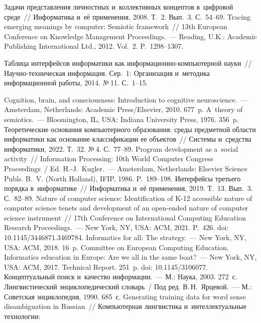 {\begin{multicols}{2}
{{\begin{thebibliography}{99}
 Задачи пред\-став\-ле\-ния 
личностных и~коллективных кон\-цеп\-тов в~циф\-ро\-вой среде~// Информатика 
и~её применения, 2008. Т.~2. Вып.~3. С.~54--69.
 Tracing emerging meanings by computer: Semiotic framework~// 
13th European Conference on Knowledge Management Proceedings.~--- Reading, 
U.K.: Academic Publishing International Ltd., 2012. Vol.~2. P.~1298--1307.

 Таблица интерфейсов информатики как 
 ин\-фор\-ма\-ци\-он\-но-ком\-пью\-тер\-ной науки~//  
На\-уч\-но-тех\-ни\-че\-ская информация. Сер.~1: Организация и~методика 
информационной работы, 2014. №\,11. С.~\mbox{1--15}.

 Cognition, brain, and consciousness: Introduction to 
cognitive neuroscience.~--- Amsterdam, Netherlands: Academic Press/Elsevier, 
2010. 677~p.
 A~theory of semiotics.~--- Bloomington, IL, USA: Indiana University 
Press, 1976. 356~p.
 Тео\-ре\-ти\-че\-ские основания компьютерного образования: 
среды предметной об\-ласти информатики как основание классификации ее 
объектов~// Сис\-те\-мы и~средства информатики, 2022. Т.~32. №\,4.  
С.~77--89.
 Program development as a~social activity~// Information 
Processing: 10th World Computer Congress Proceedings~/ Ed. H.-J.~Kugler.~--- Amsterdam, Netherlands: 
Elsevier Science Publs. B.~V. (North Holland), IFIP, 1986. P.~189--198.
 Интерфейсы треть\-его порядка в~информатике~// 
Информатика и~её применения, 2019. Т.~13. Вып.~3. С.~82--89.
 Nature of computer science: 
Identification of K-12 accessible nature of computer science tenets and 
development of an open-ended nature of computer science instrument~// 17th  
Conference on International Computing Education Research Proceedings.~---  
New York, NY, USA: ACM, 2021. P.~426. doi: 10.1145/3446871.3469784.
 Informatics for 
all: The strategy.~--- New York, NY, USA: ACM, 2018. 16~p.
  Committee on European Computing Education. Informatics education in Europe: Are we all in the same boat?~--- New York, NY, USA: 
ACM, 2017. Technical Report.  251~p. doi: 10.1145/3106077.
 Концептуальный поиск и~качество информации.~--- М.: 
Наука, 2003. 272~с.
Лингвистический энциклопедический словарь~/ Под ред. В.\,Н.~Ярцевой.~--- 
М.: Советская энциклопедия, 1990. 685~с.
 Generating training data for word sense 
disambiguation in Russian~// Компьютерная лингвистика и~интеллектуальные 
технологии:\linebreak\vspace*{-12pt}


\end{thebibliography}}}
\end{multicols}}
